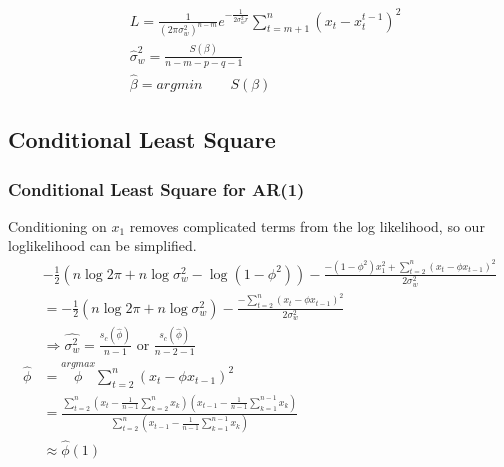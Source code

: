     \begin{align*}
        & L = \frac{1}{(2\pi \sigma_w^2)^{n-m}} e^{-\frac{1}{2\sigma_w^2 r}} \sum_{t=m+1}^n (x_t - x_t^{t-1})^2\\
        & \hat{\sigma}_w^2 = \frac{S(\beta)}{n - m - p - q - 1}\\
        & \hat{\beta} = argmin \qquad S(\beta)
    \end{align*}
\subsection{Conditional Least Square} 
\subsubsection{Conditional Least Square for AR(1)}
Conditioning on $x_1$ removes complicated terms from the log likelihood, so our loglikelihood can be simplified.
    \begin{align*}
        & - \frac{1}{2} (n \log 2\pi + n \log \sigma_w^2 - \log (1-\phi^2)) - \frac{- (1-\phi^2)x_1^2 + \sum_{t=2}^n(x_t - \phi x_{t-1})^2}{2\sigma_w^2}\\
        & = - \frac{1}{2} (n \log 2\pi + n \log \sigma_w^2) - \frac{- \sum_{t=2}^n(x_t - \phi x_{t-1})^2}{2\sigma_w^2}\\
        & \Longrightarrow \hat{\sigma_w^2} = \frac{s_c(\hat{\phi})}{n-1}  \textrm{ or } \frac{s_c(\hat{\phi})}{n-2 - 1}\\
        \hat{\phi} 
        & = \overset{argmax}{\phi} \sum_{t=2}^n(x_t - \phi x_{t-1})^2  \tag{Same obj as Least Squares} \\
        & = \frac{\sum_{t=2}^n (x_t - \frac{1}{n-1} \sum_{k=2}^n x_k)(x_{t-1} - \frac{1}{n-1} \sum_{k=1}^{n-1} x_k)}{\sum_{t=2}^n(x_{t-1} - \frac{1}{n-1} \sum_{k=1}^{n-1} x_k)}\\
        & \approx \hat{\phi}(1)
    \end{align*}